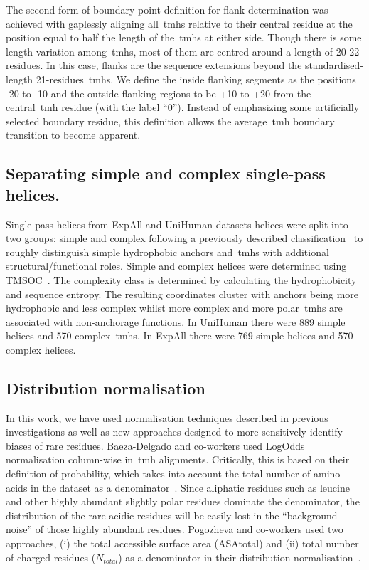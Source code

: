 The second form of boundary point definition for flank determination was achieved with gaplessly aligning all~\gls{tmh}s relative to their central residue at the position equal to half the length of the~\gls{tmh}s at either side.
Though there is some length variation among~\gls{tmh}s, most of them are centred around a length of 20-22 residues.
In this case, flanks are the sequence extensions beyond the standardised-length 21-residues~\gls{tmh}s.
We define the inside flanking segments as the positions -20 to -10 and the outside flanking regions to be +10 to +20 from the central~\gls{tmh} residue (with the label ``0'').
Instead of emphasizing some artificially selected boundary residue, this definition allows the average~\gls{tmh} boundary transition to become apparent.

\subsection{Separating simple and complex single-pass helices.}

Single-pass helices from ExpAll and UniHuman datasets helices were split into two groups: simple and complex following a previously described classification~\cite{Wong2011,Wong2012} to roughly distinguish simple hydrophobic anchors and~\gls{tmh}s with additional structural/functional roles.
Simple and complex helices were determined using TMSOC~\cite{Wong2012}.
The complexity class is determined by calculating the hydrophobicity and sequence entropy.
The resulting coordinates cluster with anchors being more hydrophobic and less complex whilst more complex and more polar~\gls{tmh}s are associated with non-anchorage functions.
In UniHuman there were 889 simple helices and 570 complex~\gls{tmh}s.
In ExpAll there were 769 simple helices and 570 complex helices.

\subsection{Distribution normalisation}

In this work, we have used normalisation techniques described in previous investigations as well as new approaches designed to more sensitively identify biases of rare residues.
Baeza-Delgado and co-workers used LogOdds normalisation column-wise in~\gls{tmh} alignments.
Critically, this is based on their definition of probability, which takes into account the total number of amino acids in the dataset as a denominator~\cite{Baeza-Delgado2013}.
Since aliphatic residues such as leucine and other highly abundant slightly polar residues dominate the denominator, the distribution of the rare acidic residues will be easily lost in the ``background noise'' of those highly abundant residues.
Pogozheva and co-workers used two approaches, (i) the total accessible surface area (ASAtotal) and (ii) total number of charged residues (${N}_{total}$) as a denominator in their distribution normalisation~\cite{Pogozheva2013}.

